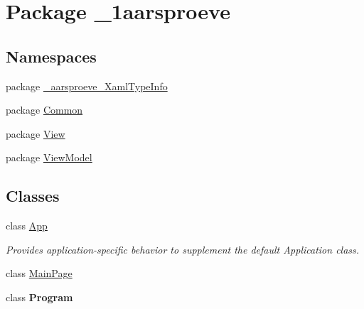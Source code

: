 \hypertarget{namespace__1aarsproeve}{}\section{Package \+\_\+1aarsproeve}
\label{namespace__1aarsproeve}
\subsection*{Namespaces}
\begin{DoxyCompactItemize}
\item 
package \hyperlink{namespace__1aarsproeve_1_1__aarsproeve___xaml_type_info}{\+\_\+aarsproeve\+\_\+\+Xaml\+Type\+Info}
\item 
package \hyperlink{namespace__1aarsproeve_1_1_common}{Common}
\item 
package \hyperlink{namespace__1aarsproeve_1_1_view}{View}
\item 
package \hyperlink{namespace__1aarsproeve_1_1_view_model}{View\+Model}
\end{DoxyCompactItemize}
\subsection*{Classes}
\begin{DoxyCompactItemize}
\item 
class \hyperlink{class__1aarsproeve_1_1_app}{App}
\begin{DoxyCompactList}\small\item\em Provides application-\/specific behavior to supplement the default Application class. \end{DoxyCompactList}\item 
class \hyperlink{class__1aarsproeve_1_1_main_page}{Main\+Page}
\item 
class {\bfseries Program}
\end{DoxyCompactItemize}
